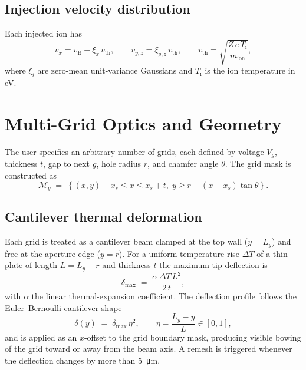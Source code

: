 \documentclass[11pt,a4paper]{article}
\begin{document}
\subsection{Injection velocity distribution}

Each injected ion has
\begin{equation}
    v_{x} = v_{\mathrm{B}} + \xi_{x}\,v_{\mathrm{th}},\qquad
    v_{y,z} = \xi_{y,z}\,v_{\mathrm{th}},\qquad
    v_{\mathrm{th}} = \sqrt{\frac{Z\,e\,T_{\mathrm{i}}}{m_{\mathrm{ion}}}},
\end{equation}
where \(\xi_i\) are zero-mean unit-variance Gaussians and
\(T_{\mathrm i}\) is the ion temperature in eV.

\section{Multi-Grid Optics and Geometry}

The user specifies an arbitrary number of grids, each defined by
voltage \(V_{g}\), thickness \(t\), gap to next \(g\), hole radius
\(r\), and chamfer angle \(\theta\).  The grid mask is constructed
as
\begin{equation}
    \mathcal{M}_{g} \;=\;
    \left\{(x,y)\,\middle|\, x_{s}\leq x \leq x_{s}+t,\;
    y \geq r + (x-x_{s})\tan\theta\right\}.
\end{equation}

\subsection{Cantilever thermal deformation}

Each grid is treated as a cantilever beam clamped at the top wall
(\(y=L_{y}\)) and free at the aperture edge (\(y=r\)).  For a
uniform temperature rise \(\Delta T\) of a thin plate of length
\(L=L_{y}-r\) and thickness \(t\) the maximum tip deflection is
\begin{equation}
    \delta_{\max} \;=\; \frac{\alpha\,\Delta T\,L^{2}}{2\,t},
    \label{eq:cantilever}
\end{equation}
with \(\alpha\) the linear thermal-expansion coefficient.  The
deflection profile follows the Euler--Bernoulli cantilever shape
\begin{equation}
    \delta(y) \;=\; \delta_{\max}\,\eta^{2},
    \qquad \eta = \frac{L_{y}-y}{L}\in[0,1],
\end{equation}
and is applied as an \(x\)-offset to the grid boundary mask,
producing visible bowing of the grid toward or away from the beam
axis.  A remesh is triggered whenever the deflection changes by
more than \SI{5}{\micro\meter}.
\end{document}
